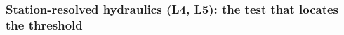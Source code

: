 \documentclass[a4paper,fleqn]{cas-sc}
\begin{document}
\subsubsection{Station-resolved hydraulics (L4, L5): the test that locates the threshold}
\end{document}
